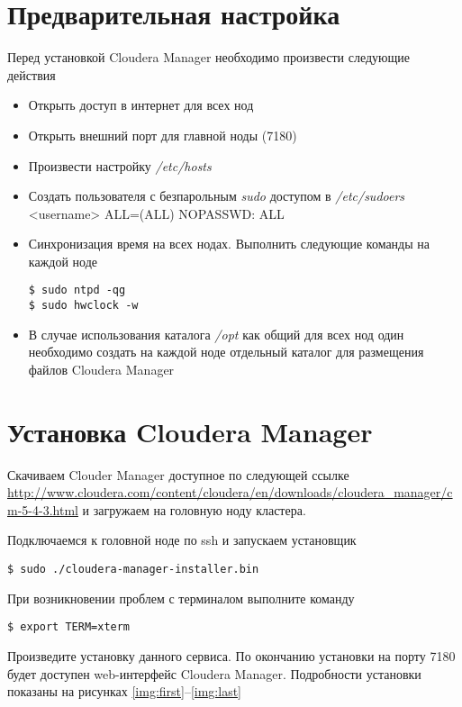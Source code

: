 \section{Предварительная настройка}
Перед установкой Cloudera Manager необходимо произвести следующие действия
\begin{itemize}
    \item Открыть доступ в интернет для всех нод
    \item Открыть внешний порт для главной ноды (7180)
    \item Произвести настройку \emph{/etc/hosts}
    \item Создать пользователя с безпарольным \emph{sudo} доступом в \emph{/etc/sudoers}\\
        <username> ALL=(ALL) NOPASSWD: ALL
    \item Синхронизация время на всех нодах. Выполнить следующие команды на каждой ноде
\begin{lstlisting}
$ sudo ntpd -qg
$ sudo hwclock -w
\end{lstlisting}
    \item В случае использования каталога \emph{/opt} как общий для всех нод один необходимо
    создать на каждой ноде отдельный каталог для размещения файлов Cloudera Manager
\end{itemize}

\newpage

\section{Установка Cloudera Manager}
Скачиваем Clouder Manager доступное по следующей ссылке 
\url{http://www.cloudera.com/content/cloudera/en/downloads/cloudera_manager/cm-5-4-3.html} и 
загружаем на головную ноду кластера.

Подключаемся к головной ноде по ssh и запускаем установщик
\begin{lstlisting}
$ sudo ./cloudera-manager-installer.bin
\end{lstlisting}

При возникновении проблем с терминалом выполните команду
\begin{lstlisting}
$ export TERM=xterm
\end{lstlisting}

Произведите установку данного сервиса. По окончанию установки на порту 7180 будет доступен web-интерфейс 
Cloudera Manager. Подробности установки показаны на рисунках \ref{img:first}--\ref{img:last}

